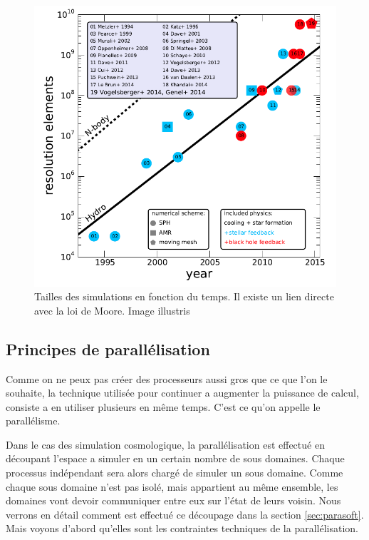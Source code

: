 \begin{figure}[bth]
        \includegraphics[width=.95\linewidth]{img/02/figure_simulations_with_time.png} 
        \caption{Tailles des simulations en fonction du temps.
        Il existe un lien directe avec la loi de Moore.
         Image illustris}
 		\label{fig:taillesimu}
\end{figure}


\subsection{Principes de parallélisation}

Comme on ne peux pas créer des processeurs aussi gros que ce que l'on le souhaite, la technique utilisée pour continuer a augmenter la puissance de calcul, consiste a en utiliser plusieurs en même temps.
C'est ce qu'on appelle le parallélisme.

Dans le cas des simulation cosmologique, la parallélisation est effectué en découpant l'espace a simuler en un certain nombre de sous domaines.
Chaque processus indépendant sera alors chargé de simuler un sous domaine.
Comme chaque sous domaine n'est pas isolé, mais appartient au même ensemble, les domaines vont devoir communiquer entre eux sur l'état de leurs voisin.
Nous verrons en détail comment est effectué ce découpage dans la section \ref{sec:parasoft}.
Mais voyons d'abord qu'elles sont les contraintes techniques de la parallélisation.

